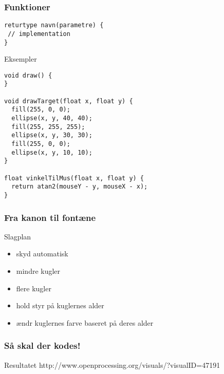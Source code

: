 \documentclass{beamer}
\begin{document}
\begin{frame}[fragile]
  \frametitle{Funktioner}
    
\begin{verbatim}
returtype navn(parametre) {
 // implementation
}
\end{verbatim}
  
  \begin{block}{Eksempler}
  {\tiny
\begin{verbatim}
void draw() {
}

void drawTarget(float x, float y) {
  fill(255, 0, 0);
  ellipse(x, y, 40, 40);
  fill(255, 255, 255);  
  ellipse(x, y, 30, 30);
  fill(255, 0, 0);
  ellipse(x, y, 10, 10);  
}

float vinkelTilMus(float x, float y) {
  return atan2(mouseY - y, mouseX - x);
}

\end{verbatim}    
}
  \end{block}

\end{frame}



\begin{frame}[fragile]
  \frametitle{Fra kanon til fontæne}
  
  \begin{block}{Slagplan}
    \begin{itemize}
    \item skyd automatisk
    \item mindre kugler
    \item flere kugler
    \item hold styr på kuglernes alder
    \item ændr kuglernes farve baseret på deres alder
    \end{itemize}
  \end{block}
    
\end{frame}

\begin{frame}[fragile]
  \frametitle{Så skal der kodes!}
      
  \begin{block}{Resultatet}  
  http://www.openprocessing.org/visuals/?visualID=47191
  \end{block}

\end{frame}
\end{document}
